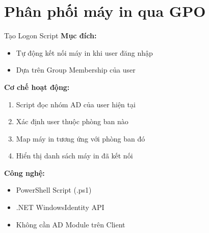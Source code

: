 \documentclass{beamer}
\begin{document}
    \section{Phân phối máy in qua GPO}
    \begin{frame}{Tạo Logon Script}
        \textbf{Mục đích:}
        \begin{itemize}
            \item Tự động kết nối máy in khi user đăng nhập
            \item Dựa trên Group Membership của user
        \end{itemize}
        
        \vspace{0.3cm}
        \textbf{Cơ chế hoạt động:}
        \begin{enumerate}
            \item Script đọc nhóm AD của user hiện tại
            \item Xác định user thuộc phòng ban nào
            \item Map máy in tương ứng với phòng ban đó
            \item Hiển thị danh sách máy in đã kết nối
        \end{enumerate}
        
        \vspace{0.3cm}
        \textbf{Công nghệ:}
        \begin{itemize}
            \item PowerShell Script (.ps1)
            \item .NET WindowsIdentity API
            \item Không cần AD Module trên Client
        \end{itemize}
    \end{frame}
    
\end{document}
